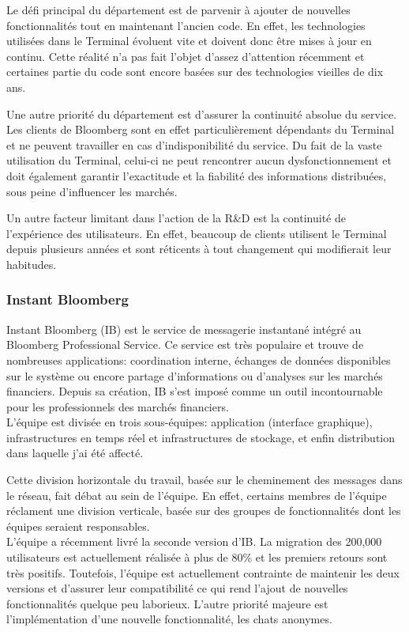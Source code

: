 \documentclass[11pt, oneside, titlepage, a4paper]{article}
\begin{document}
Le défi principal du département est de parvenir à ajouter de nouvelles fonctionnalités tout en maintenant l'ancien code. En effet, les technologies utilisées dans le Terminal évoluent vite et doivent donc être mises à jour en continu. Cette réalité n'a pas fait l'objet d'assez d'attention récemment et certaines partie du code sont encore basées sur des technologies vieilles de dix ans.

Une autre priorité du département est d'assurer la continuité absolue du service. Les clients de Bloomberg sont en effet particulièrement dépendants du Terminal et ne peuvent travailler en cas d'indisponibilité du service. Du fait de la vaste utilisation du Terminal, celui-ci ne peut rencontrer aucun dysfonctionnement et doit également garantir l'exactitude et la fiabilité des informations distribuées, sous peine d'influencer les marchés.

Un autre facteur limitant dans l'action de la R\&D est la continuité de l'expérience des utilisateurs. En effet, beaucoup de clients utilisent le Terminal depuis plusieurs années et sont réticents à tout changement qui modifierait leur habitudes.
		\subsubsection{Instant Bloomberg}
Instant Bloomberg (IB) est le service de messagerie instantané intégré au Bloomberg Professional Service. Ce service est très populaire et trouve de nombreuses applications: coordination interne, échanges de données disponibles sur le système ou encore partage d'informations ou d'analyses sur les marchés financiers. Depuis sa création, IB s'est imposé comme un outil incontournable pour les professionnels des marchés financiers.
\\

L'équipe est divisée en trois sous-équipes: application (interface graphique), infrastructures en temps réel et infrastructures de stockage, et enfin distribution dans laquelle j'ai été affecté.

Cette division horizontale du travail, basée sur le cheminement des messages dans le réseau, fait débat au sein de l'équipe. En effet, certains membres de l'équipe réclament une division verticale, basée sur des groupes de fonctionnalités dont les équipes seraient responsables.
\\

L'équipe a récemment livré la seconde version d'IB. La migration des 200,000 utilisateurs est actuellement réalisée à plus de 80\% et les premiers retours sont très positifs. Toutefois, l'équipe est actuellement contrainte de maintenir les deux versions et d'assurer leur compatibilité ce qui rend l'ajout de nouvelles fonctionnalités quelque peu laborieux. L'autre priorité majeure est l'implémentation d'une nouvelle fonctionnalité, les chats anonymes.
\end{document}
